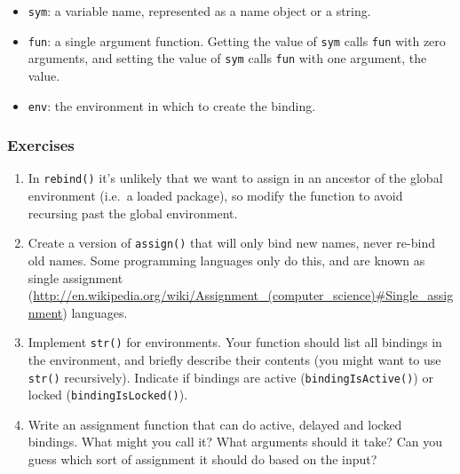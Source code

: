 \documentclass[oneside]{book}
\renewcommand{\href}[2]{#2 (\url{#1})}
\begin{document}
\begin{itemize}
\item
  \texttt{sym}: a variable name, represented as a name object or a
  string.
\item
  \texttt{fun}: a single argument function. Getting the value of
  \texttt{sym} calls \texttt{fun} with zero arguments, and setting the
  value of \texttt{sym} calls \texttt{fun} with one argument, the value.
\item
  \texttt{env}: the environment in which to create the binding.
\end{itemize}

\subsubsection{Exercises}\label{exercises-3}

\begin{enumerate}
\def\labelenumi{\arabic{enumi}.}
\item
  In \texttt{rebind()} it's unlikely that we want to assign in an
  ancestor of the global environment (i.e.~a loaded package), so modify
  the function to avoid recursing past the global environment.
\item
  Create a version of \texttt{assign()} that will only bind new names,
  never re-bind old names. Some programming languages only do this, and
  are known as
  \href{http://en.wikipedia.org/wiki/Assignment_(computer_science)\#Single_assignment}{single
  assignment} languages.
\item
  Implement \texttt{str()} for environments. Your function should list
  all bindings in the environment, and briefly describe their contents
  (you might want to use \texttt{str()} recursively). Indicate if
  bindings are active (\texttt{bindingIsActive()}) or locked
  (\texttt{bindingIsLocked()}).
\item
  Write an assignment function that can do active, delayed and locked
  bindings. What might you call it? What arguments should it take? Can
  you guess which sort of assignment it should do based on the input?
\end{enumerate}
\end{document}
